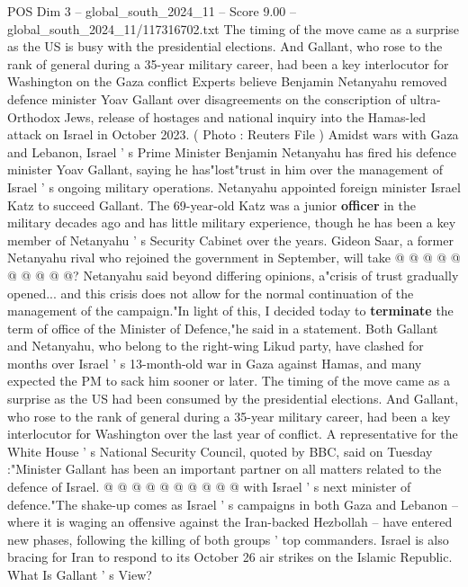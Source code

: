 \begin{textsample}{POS Dim 3 – global\_south\_2024\_11 – Score 9.00 – global\_south\_2024\_11/117316702.txt}  \label{ex:f3_pos_306}
The timing of the move came as a surprise as the US is busy with the presidential elections.
And Gallant, who rose to the rank of general during a 35-year military career, had been a key interlocutor for Washington on the Gaza conflict Experts believe Benjamin Netanyahu removed defence minister Yoav Gallant over disagreements on the conscription of ultra-Orthodox Jews, release of hostages and national inquiry into the Hamas-led attack on Israel in October 2023. ( Photo : Reuters File ) Amidst wars with Gaza and Lebanon, Israel ' s Prime Minister Benjamin Netanyahu has fired his defence minister Yoav Gallant, saying he has"lost"trust in him over the management of Israel ' s ongoing military operations.
Netanyahu appointed foreign minister Israel Katz to succeed Gallant.
The 69-year-old Katz was a junior \textbf{officer} in the military decades ago and has little military experience, though he has been a key member of Netanyahu ' s Security Cabinet over the years.
Gideon Saar, a former Netanyahu rival who rejoined the government in September, will take @ @ @ @ @ @ @ @ @ @?
Netanyahu said beyond differing opinions, a"crisis of trust gradually opened... and this crisis does not allow for the normal continuation of the management of the campaign."In light of this, I decided today to \textbf{terminate} the term of office of the Minister of Defence,"he said in a statement.
Both Gallant and Netanyahu, who belong to the right-wing Likud party, have clashed for months over Israel ' s 13-month-old war in Gaza against Hamas, and many expected the PM to sack him sooner or later.
The timing of the move came as a surprise as the US had been consumed by the presidential elections.
And Gallant, who rose to the rank of general during a 35-year military career, had been a key interlocutor for Washington over the last year of conflict.
A representative for the White House ' s National Security Council, quoted by BBC, said on Tuesday :"Minister Gallant has been an important partner on all matters related to the defence of Israel. @ @ @ @ @ @ @ @ @ @ with Israel ' s next minister of defence."The shake-up comes as Israel ' s campaigns in both Gaza and Lebanon -- where it is waging an offensive against the Iran-backed Hezbollah -- have entered new phases, following the killing of both groups ' top commanders.
Israel is also bracing for Iran to respond to its October 26 air strikes on the Islamic Republic.
What Is Gallant ' s View?

\end{textsample}
